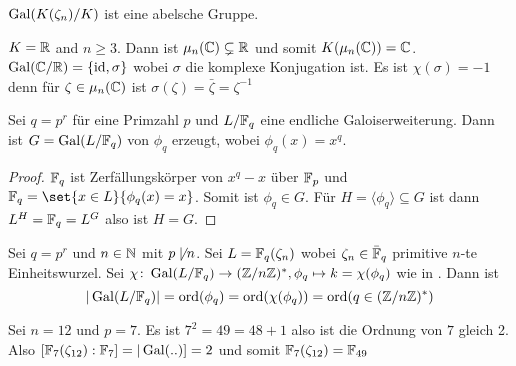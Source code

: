 \begin{Kor}
    \(\operatorname{Gal}(K(\zeta_n)/K)\) ist eine abelsche Gruppe.
\end{Kor}
\begin{Bsp}
    \(K=\mathbb{R}\) and \(n\geq 3\). Dann ist \(\mu_n(\mathbb{C})\subsetneq\mathbb{R}\) und somit \(K(\mu_n(\mathbb{C}))=\mathbb{C}\).
    \(\operatorname{Gal}(\mathbb{C}/\mathbb{R})=\{\mathrm{id},\sigma\}\) wobei \(\sigma\) die komplexe Konjugation ist. Es ist \(\chi(\sigma)=-1\) denn
    für \(\zeta\in\mu_n(\mathbb{C})\) ist \(\sigma(\zeta)=\bar\zeta=\zeta^{-1}\)
\end{Bsp}
\begin{Satz}
    Sei \(q=p^r\) für eine Primzahl \(p\) und \(L/\mathbb{F}_q\) eine endliche Galoiserweiterung. Dann ist \(G=\operatorname{Gal}(L/\mathbb{F}_q)\) von \(\phi_q\) erzeugt, wobei \(\phi_q(x)=x^q\).
\end{Satz}
\begin{proof}
    \(\mathbb{F}_q\) ist Zerfällungskörper von \(x^q-x\) über \(\mathbb{F}_p\) und
    \(\FF_q=\set{x\in L}{ \phi_q(x)=x}\). Somit ist \(\phi_q\in G\).
    Für \(H=\langle \phi_q\rangle\subseteq G\) ist 
    dann \(L^H=\mathbb{F}_q=L^G\) also ist \(H=G\).
\end{proof}
\begin{Kor}
    Sei \(q=p^r\) und \(n\in\mathbb{N}\) mit \(p\not\mid n\). Sei \(L=\mathbb{F}_q(\zeta_n)\) wobei \(\zeta_n\in\bar {\mathbb{F}}_q\) primitive \(n\)-te Einheitswurzel.
    Sei \(\chi\colon \operatorname{Gal}(L/\mathbb{F}_q)\to (\mathbb{Z}/n\mathbb{Z})^*, \phi_q\mapsto k=\chi(\phi_q)\) wie in . Dann ist
    \[|\operatorname{Gal}(L/\mathbb{F}_q)|=\operatorname{ord}(\phi_q)=\operatorname{ord}(\chi(\phi_q))=\operatorname{ord}(q\in(\mathbb{Z}/n\mathbb{Z})^*)\]
\end{Kor}
\begin{Bsp}
  Sei \(n=12\) und \(p=7\). Es ist \(7^2=49 =48+1\) also ist die Ordnung von \(7\) gleich 2.
    Also \([\mathbb{F}_7(\zeta_{12}):\mathbb{F}_7]=|\operatorname{Gal}(..)]=2\) und somit \(\mathbb{F}_7(\zeta_{12})=\mathbb{F}_{49}\)
\end{Bsp}
\begin{Satz}
    Der Homomorphismus \(\chi\colon\Gal(\QQ(\zeta_n/\QQ)\to(\ZZ/n\ZZ)^*\) aus } ist bijektiv, das heißt \([\QQ(\zeta_n)\colon \QQ]=\varphi(n)\).
\end{Satz}
